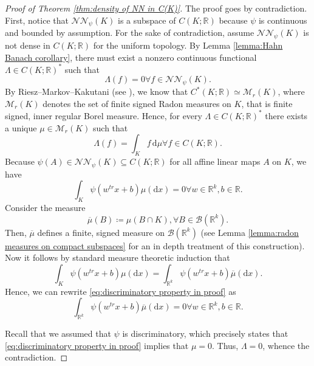 \documentclass[11pt,a4paper,twoside,openany]{report}
\numberwithin{equation}{section}
\newcommand{\diff}{\mathrm{d}}
\theoremstyle{plain} %
\theoremstyle{definition} %
\theoremstyle{remark} %
\let\parencite\authnumparencite
\begin{document}
\begin{proof}[Proof of Theorem \ref{thm:density of NN in C(K)}]
    The proof goes by contradiction. First, notice that \(\mathcal{NN}_{\psi}(K)\) is a subspace of \(C(K;\mathbb{R})\) because \(\psi\) is continuous and bounded by assumption. For the sake of contradiction, assume \(\mathcal{NN}_{\psi}(K)\) is not dense in \(C(K;\mathbb{R})\) for the uniform topology. By Lemma \ref{lemma:Hahn Banach corollary}, there must exist a nonzero continuous functional \(\Lambda\in C(K;\mathbb{R})^*\) such that 
    \begin{equation*}
        \Lambda(f)=0\forall f\in\mathcal{NN}_{\psi}(K).
    \end{equation*}
     By Riesz–Markov–Kakutani (see \parencite[Thm.~7.10.4.]{Bogachev2007MeasureTheory}), we know that \(C^*(K;\mathbb{R})\simeq\mathcal{M}_r(K)\), where \(\mathcal{M}_r(K)\) denotes the set of finite signed Radon measures on \(K\), that is finite signed, inner regular Borel measure. Hence, for every \(\Lambda\in C(K;\mathbb{R})^*\) there exists a unique \(\mu\in\mathcal{M}_r(K)\) such that 
 \begin{equation*}
     \Lambda(f)=\int_K f\,\diff\mu\forall f\in C(K;\mathbb{R}).
 \end{equation*}
   Because \(\psi(A)\in\mathcal{NN}_{\psi}(K)\subseteq C(K;\mathbb{R})\) for all affine linear maps \(A\) on \(K\), we have
    \begin{equation*}
        \int_K \psi(w^{tr}x+b)\mu(\diff x)=0\forall w\in\mathbb{R}^k,b\in\mathbb{R}.
    \end{equation*}
    Consider the measure 
    \begin{equation*}
        \overline{\mu}(B)\coloneqq \mu(B\cap K),\forall B\in\mathcal{B}(\mathbb{R}^k).
    \end{equation*}
    Then, \(\overline{\mu}\) defines a finite, signed measure on \(\mathcal{B}(\mathbb{R}^k)\) (see Lemma \ref{lemma:radon measures on compact subspaces} for an in depth treatment of this construction). Now it follows by standard measure theoretic induction that 
    \begin{equation*}
         \int_K \psi(w^{tr}x+b)\mu(\diff x)=\int_{\mathbb{R}^k}\psi(w^{tr}x+b)\overline{\mu}(\diff x).
    \end{equation*}
    Hence, we can rewrite \eqref{eq:discriminatory property in proof} as 
    \begin{equation}\label{eq:discriminatory property in proof}
    \int_{\mathbb{R}^k}\psi(w^{tr}x+b)\overline{\mu}(\diff x)=0\forall w\in\mathbb{R}^k,b\in\mathbb{R}.
    \end{equation}
    
Recall that we assumed that \(\psi\) is discriminatory, which precisely states that \eqref{eq:discriminatory property in proof} implies that \(\mu=0\). Thus, \(\Lambda=0\), whence the contradiction.
\end{proof}
\end{document}

